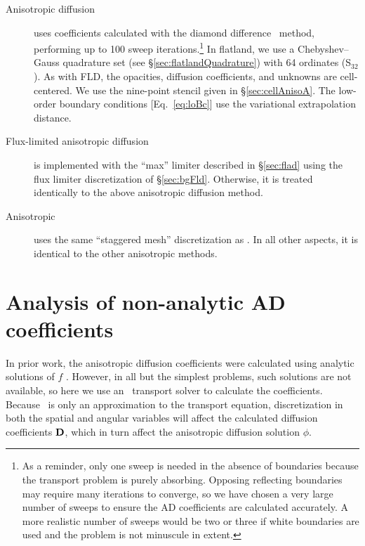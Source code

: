 \begin{description}
  \item[Anisotropic diffusion] uses
    coefficients calculated with the diamond difference \SN\ meth\-od,
    performing up to 100 sweep iterations.\footnote{%
      As a reminder, only one sweep is needed in the absence of boundaries
      because the transport problem is purely absorbing. Opposing reflecting
      boundaries may require many iterations to converge, so we have chosen a
      very large number of sweeps to ensure the AD coefficients are calculated
      accurately. A more realistic number of sweeps would be two or three if
      white boundaries are used and the problem is not minuscule in extent.
    }
    In flatland, we use a Chebyshev--Gauss quadrature set
    (see \S\ref{sec:flatlandQuadrature}) with 64 ordinates (S$_{32}$).
    As with FLD, the opacities, diffusion coefficients, and unknowns are
    cell-centered. We use the nine-point stencil given in
    \S\ref{sec:cellAnisoA}. The low-order boundary conditions
    [Eq.~\eqref{eq:loBc}] use the variational extrapolation distance.

  \item[Flux-limited anisotropic diffusion] is implemented with the
    ``max'' limiter described in \S\ref{sec:flad} using the flux limiter
    discretization of \S\ref{sec:bgFld}. Otherwise, it is treated identically to
    the above anisotropic diffusion method.

  \item[Anisotropic \Pone] uses the same ``staggered mesh'' discretization
    as \Pone. In all other aspects, it is identical to the other anisotropic
    methods.

\end{description}

\section{Analysis of non-analytic AD coefficients}

In prior work, the anisotropic diffusion coefficients were calculated using
analytic solutions of $f$ \cite{Lar2009c}. However, in all but the simplest
problems, such solutions are not available, so here we use an \SN\ transport
solver to
calculate the coefficients. Because \SN\ is only an approximation to the
transport equation, discretization in both the spatial and angular variables
will affect the calculated diffusion coefficients $\mathbf{D}$, which in turn affect
the anisotropic diffusion solution $\phi$.

